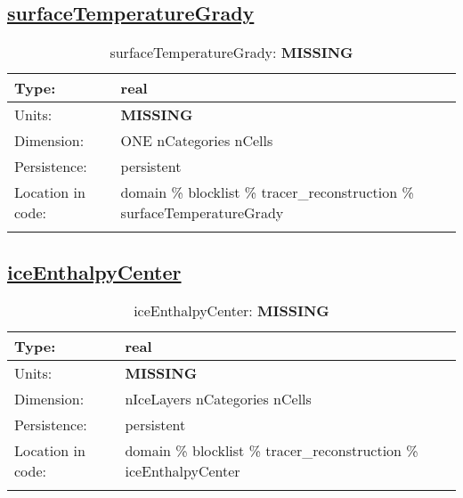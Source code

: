 \subsection[surfaceTemperatureGrady]{\hyperref[sec:var_tab_tracer_reconstruction]{surfaceTemperatureGrady}}
\label{subsec:var_sec_tracer_reconstruction_surfaceTemperatureGrady}
\begin{center}
\begin{longtable}{| p{2.0in} | p{4.0in} |}
        \hline 
        Type: & real \\
        \hline 
        Units: & {\bf \color{red} MISSING} \\
        \hline 
        Dimension: & ONE nCategories nCells \\
        \hline 
        Persistence: & persistent \\
        \hline 
         Location in code: & domain \% blocklist \% tracer\_reconstruction \% surfaceTemperatureGrady \\
         \hline 
    \caption{surfaceTemperatureGrady: {\bf \color{red} MISSING}}
\end{longtable}
\end{center}
\subsection[iceEnthalpyCenter]{\hyperref[sec:var_tab_tracer_reconstruction]{iceEnthalpyCenter}}
\label{subsec:var_sec_tracer_reconstruction_iceEnthalpyCenter}
\begin{center}
\begin{longtable}{| p{2.0in} | p{4.0in} |}
        \hline 
        Type: & real \\
        \hline 
        Units: & {\bf \color{red} MISSING} \\
        \hline 
        Dimension: & nIceLayers nCategories nCells \\
        \hline 
        Persistence: & persistent \\
        \hline 
         Location in code: & domain \% blocklist \% tracer\_reconstruction \% iceEnthalpyCenter \\
         \hline 
    \caption{iceEnthalpyCenter: {\bf \color{red} MISSING}}
\end{longtable}
\end{center}
